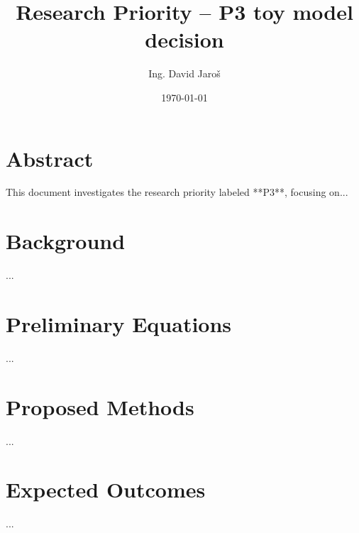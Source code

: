 \documentclass[12pt]{article}
\title{Research Priority – P3 toy model decision}
\author{Ing. David Jaroš}
\date{\today}
\begin{document}
\maketitle

\section*{Abstract}
This document investigates the research priority labeled **P3**, focusing on...

\section*{Background}
...

\section*{Preliminary Equations}
...

\section*{Proposed Methods}
...

\section*{Expected Outcomes}
...
\end{document}
